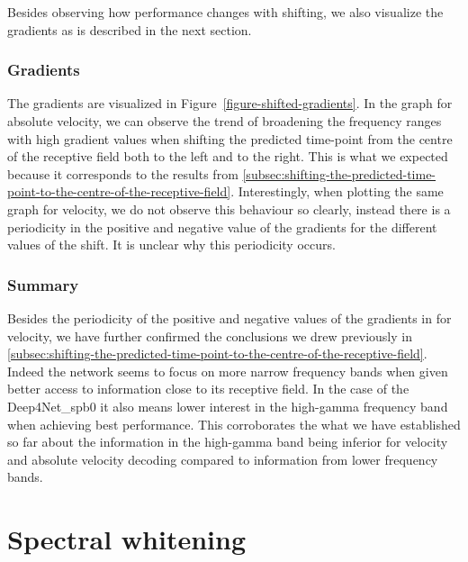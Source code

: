 Besides observing how performance changes with shifting, we also visualize the gradients as is described in the next section.

\subsubsection{Gradients}\label{subsubsec:across-shiftig-gradients}
The gradients are visualized in Figure~\ref{figure-shifted-gradients}.
In the graph for absolute velocity, we can observe the trend of broadening the frequency ranges with high gradient values when shifting the predicted time-point from the centre of the receptive field both to the left and to the right.
This is what we expected because it corresponds to the results from \ref{subsec:shifting-the-predicted-time-point-to-the-centre-of-the-receptive-field}. 
Interestingly, when plotting the same graph for velocity, we do not observe this behaviour so clearly, instead there is a periodicity in the positive and negative value of the gradients for the different values of the shift.
It is unclear why this periodicity occurs.

\subsubsection{Summary}\label{subsubsec:across-shiftig-summary}
Besides the periodicity of the positive and negative values of the gradients in for velocity, we have further confirmed the conclusions we drew previously in \ref{subsec:shifting-the-predicted-time-point-to-the-centre-of-the-receptive-field}. 
Indeed the network seems to focus on more narrow frequency bands when given better access to information close to its receptive field.
In the case of the Deep4Net\_spb0 it also means lower interest in the high-gamma frequency band when achieving best performance. 
This corroborates the what we have established so far about the information in the high-gamma band being inferior for velocity and absolute velocity decoding compared to information from lower frequency bands. 


\section{Spectral whitening}\label{sec:spectral-whitening}


